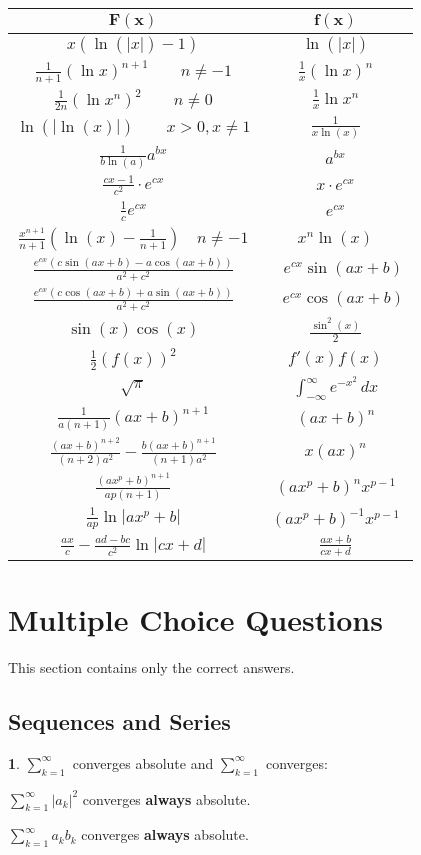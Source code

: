 \documentclass[a4paper, 10pt]{article}
\theoremstyle{definition}
\theoremstyle{ex}
\newtheorem*{exercise}{}
\theoremstyle{named}
\begin{document}
\begin{center}
\begin{tabular}{c|c}
    $\mathbf{F(x)}$ & $\mathbf{f(x)}$ \\
    \midrule
    $x  (\ln(|x|) - 1)$ & $\ln(|x|)$ \\
    $\frac{1}{n+1} (\ln x)^{n+1} \quad \quad n \neq -1 $ & $ \frac{1}{x}(\ln x)^n$ \\
    $\frac{1}{2n} (\ln x^n)^{2} \quad \quad n \neq 0 $ & $ \frac{1}{x}\ln x^n$ \\
    $\ln(|\ln(x)|) \quad \quad x > 0, x \neq 1$ & $\frac{1}{x \ln(x)}$ \\
    $\frac{1}{b \ln(a)} a^{bx}$ & $a^{bx}$ \\
    $\frac{cx - 1}{c^2} \cdot e^{cx}$ & $x \cdot e^{cx}$ \\
    $\frac{1}{c}e^{cx}$ & $e^{cx}$ \\
    $\frac{x^{n + 1}}{n + 1} \left(\ln(x) - \frac{1}{n + 1}\right) \quad n \neq -1 $ & $x^n \ln(x)$ \\
    $\frac{e^{cx} \left(c \sin(ax + b) - a \cos(ax + b) \right)}{a^2 + c^2}$ & $\quad e^{cx} \sin (ax + b) $ \\
    $\frac{e^{cx} \left(c \cos (ax + b) + a \sin(ax + b) \right)}{a^2 + c^2}$ & $\quad e^{cx} \cos (ax+b)$ \\
    $\sin(x)\cos(x)$ & $\frac{\sin^2(x)}{2}$ \\
    $\frac{1}{2}(f(x))^2$ & $f'(x) f(x)$ \\
    $\sqrt{\pi}$ & $\int_{-\infty}^\infty e^{-x^2} \,dx$ \\
    $\frac{1}{a(n+1)}(ax+b)^{n+1}$ & $(ax+b)^n$ \\
    $\frac{(ax+b)^{n+2}}{(n+2)a^2} - \frac{b(ax+b)^{n+1}}{(n+1)a^2}$ & $x(ax)^n$ \\
    $\frac{(ax^p+b)^{n+1}}{ap(n+1)}$ & $(ax^p+b)^n x^{p-1}$ \\
    $\frac{1}{ap} \ln |ax^p + b|$ & $(ax^p + b)^{-1} x^{p-1}$ \\
    $\frac{ax}{c} - \frac{ad-bc}{c^2} \ln |cx +d|$ & $\frac{ax+b}{cx+d}$ \\
\end{tabular}
\end{center}

\framebreak
\section*{Multiple Choice Questions}

This section contains only the correct answers.
\subsection*{Sequences and Series}
\begin{exercise}
    $\sum_{k = 1}^\infty$ converges absolute and $\sum_{k=1}^\infty$ converges:
    \begin{exanswers}
        \item $\sum_{k=1}^\infty |a_k|^2$ converges \textbf{always} absolute.
        \item $\sum_{k=1}^\infty a_k b_k$ converges \textbf{always} absolute.
    \end{exanswers}
\end{exercise}
\end{document}
